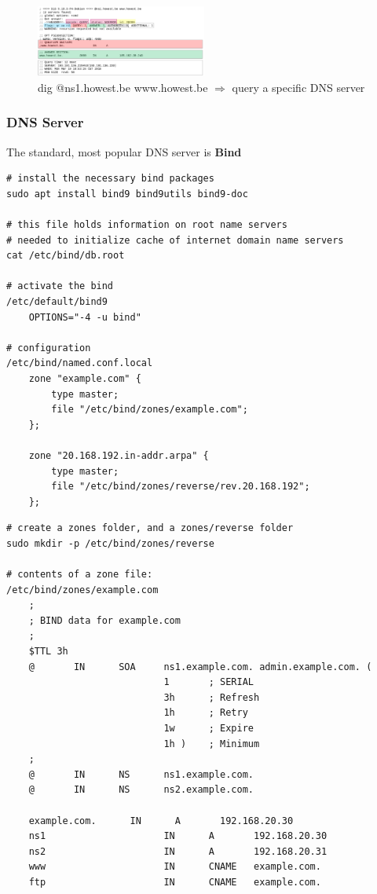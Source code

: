 \documentclass{article}
\begin{document}
\begin{figure}[H]
    \centering
    \includegraphics[width=0.5\textwidth]{dig5.png}
    \caption{dig @ns1.howest.be www.howest.be $\Rightarrow$ query a specific DNS server}
\end{figure}

\subsubsection{DNS Server}

The standard, most popular DNS server is \textbf{Bind}

\begin{verbatim}
# install the necessary bind packages
sudo apt install bind9 bind9utils bind9-doc

# this file holds information on root name servers
# needed to initialize cache of internet domain name servers
cat /etc/bind/db.root

# activate the bind
/etc/default/bind9
    OPTIONS="-4 -u bind"

# configuration
/etc/bind/named.conf.local 
    zone "example.com" {
        type master;
        file "/etc/bind/zones/example.com";
    };

    zone "20.168.192.in-addr.arpa" {
        type master;
        file "/etc/bind/zones/reverse/rev.20.168.192";
    };

\end{verbatim}

\begin{verbatim}
# create a zones folder, and a zones/reverse folder
sudo mkdir -p /etc/bind/zones/reverse

# contents of a zone file:
/etc/bind/zones/example.com
    ;
    ; BIND data for example.com
    ;
    $TTL 3h
    @       IN      SOA     ns1.example.com. admin.example.com. (
                            1       ; SERIAL
                            3h      ; Refresh
                            1h      ; Retry
                            1w      ; Expire
                            1h )    ; Minimum
    ;
    @       IN      NS      ns1.example.com.
    @       IN      NS      ns2.example.com.

    example.com.      IN      A       192.168.20.30
    ns1                     IN      A       192.168.20.30
    ns2                     IN      A       192.168.20.31
    www                     IN      CNAME   example.com.
    ftp                     IN      CNAME   example.com.
\end{verbatim}
\end{document}
